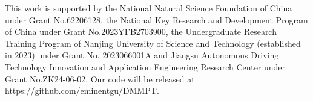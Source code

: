 \documentclass{ecai}
\begin{document}
\begin{ack}This work is supported by the National Natural Science Foundation of China under Grant No.62206128, the National Key Research and Development Program of China under Grant No.2023YFB2703900, the Undergraduate Research Training Program of Nanjing University
of Science and Technology (established in 2023) under Grant No. 2023066001A and Jiangsu Autonomous Driving Technology Innovation and Application Engineering Research Center under Grant No.ZK24-06-02. Our code will be released at https://github.com/eminentgu/DMMPT.
\end{ack}

\end{document}
